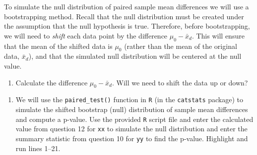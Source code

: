 \documentclass[
]{report}
\newenvironment{Shaded}{\begin{snugshade}}{\end{snugshade}}
\newcommand{\AttributeTok}[1]{\textcolor[rgb]{0.77,0.63,0.00}{#1}}
\newcommand{\CommentTok}[1]{\textcolor[rgb]{0.56,0.35,0.01}{\textit{#1}}}
\newcommand{\DecValTok}[1]{\textcolor[rgb]{0.00,0.00,0.81}{#1}}
\newcommand{\FunctionTok}[1]{\textcolor[rgb]{0.00,0.00,0.00}{#1}}
\newcommand{\NormalTok}[1]{#1}
\newcommand{\SpecialCharTok}[1]{\textcolor[rgb]{0.00,0.00,0.00}{#1}}
\newcommand{\StringTok}[1]{\textcolor[rgb]{0.31,0.60,0.02}{#1}}
\providecommand{\tightlist}{%
  \setlength{\itemsep}{0pt}\setlength{\parskip}{0pt}}
\begin{document}
To simulate the null distribution of paired sample mean differences we will use a bootstrapping method. Recall that the null distribution must be created under the assumption that the null hypothesis is true. Therefore, before bootstrapping, we will need to \emph{shift} each data point by the difference \(\mu_0 - \bar{x}_d\). This will ensure that the mean of the shifted data is \(\mu_0\) (rather than the mean of the original data, \(\bar{x}_d\)), and that the simulated null distribution will be centered at the null value.

\begin{enumerate}
\def\labelenumi{\arabic{enumi}.}
\setcounter{enumi}{11}
\tightlist
\item
  Calculate the difference \(\mu_0 - \bar{x}_d\). Will we need to shift the data up or down?
\end{enumerate}

\vspace{.7in}

\begin{enumerate}
\def\labelenumi{\arabic{enumi}.}
\setcounter{enumi}{12}
\tightlist
\item
  We will use the \texttt{paired\_test()} function in \texttt{R} (in the \texttt{catstats} package) to simulate the shifted bootstrap (null) distribution of sample mean differences and compute a p-value. Use the provided \texttt{R} script file and enter the calculated value from question 12 for \texttt{xx} to simulate the null distribution and enter the summary statistic from question 10 for \texttt{yy} to find the p-value. Highlight and run lines 1--21.
\end{enumerate}

\begin{Shaded}
\end{Shaded}
\end{document}

